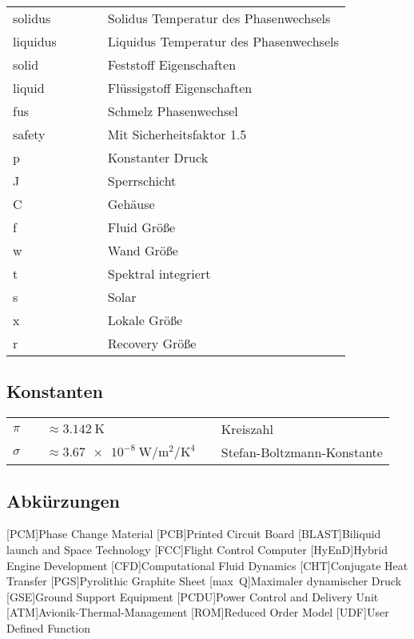 \begin{supertabular}{p{10mm}p{3mm}p{20mm}p{3mm}l}
solidus && && Solidus Temperatur des Phasenwechsels\\
liquidus && && Liquidus Temperatur des Phasenwechsels\\
solid && && Feststoff Eigenschaften\\
liquid && && Flüssigstoff Eigenschaften\\
fus && && Schmelz Phasenwechsel\\
safety && && Mit Sicherheitsfaktor 1.5\\
p && && Konstanter Druck\\
J && && Sperrschicht\\
C && && Gehäuse\\
f && && Fluid Größe\\
w && && Wand Größe\\
t && && Spektral integriert\\
s && && Solar\\
x && && Lokale Größe\\
r && && Recovery Größe

\end{supertabular} 

\subsection*{Konstanten}

\begin{supertabular}{p{10mm}p{3mm}p{50mm}p{3mm}l}
$\pi$ && $\approx \SI{3.142}{\kelvin}$ && Kreiszahl\\
$\sigma$ && $\approx \SI{3.67e-8}{\watt\per\meter\squared\per\kelvin\tothe{4}}$ && Stefan-Boltzmann-Konstante\\
\end{supertabular}

\newpage

\subsection*{Abkürzungen}
\begin{acronym}[BLAST]
[PCM]{Phase Change Material}
[PCB]{Printed Circuit Board}
[BLAST]{Biliquid launch and Space Technology}
[FCC]{Flight Control Computer}
[HyEnD]{Hybrid Engine Development}
[CFD]{Computational Fluid Dynamics}
[CHT]{Conjugate Heat Transfer}
[PGS]{Pyrolithic Graphite Sheet}
[max~Q]{Maximaler dynamischer Druck}
[GSE]{Ground Support Equipment}
[PCDU]{Power Control and Delivery Unit}
[ATM]{Avionik-Thermal-Management}
[ROM]{Reduced Order Model}
[UDF]{User Defined Function}
\end{acronym}